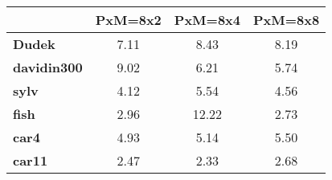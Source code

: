 \begin{tabular}{|l|c|c|c|}
\hline
&\textbf{PxM=8x2}&\textbf{PxM=8x4}&\textbf{PxM=8x8}\\\hline
\textbf{Dudek}&7.11&8.43&8.19\\\hline
\textbf{davidin300}&9.02&6.21&5.74\\\hline
\textbf{sylv}&4.12&5.54&4.56\\\hline
\textbf{fish}&2.96&12.22&2.73\\\hline
\textbf{car4}&4.93&5.14&5.50\\\hline
\textbf{car11}&2.47&2.33&2.68\\\hline
\end{tabular}
